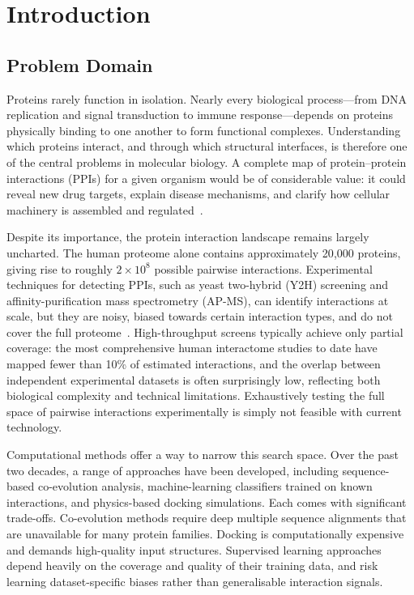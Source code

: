 \chapter{Introduction}
\label{ch:introduction}

\section{Problem Domain}
\label{sec:problem-domain}

Proteins rarely function in isolation.
Nearly every biological process---from DNA replication and signal transduction to immune response---depends on proteins physically binding to one another to form functional complexes.
Understanding which proteins interact, and through which structural interfaces, is therefore one of the central problems in molecular biology.
A complete map of protein--protein interactions (PPIs) for a given organism would be of considerable value: it could reveal new drug targets, explain disease mechanisms, and clarify how cellular machinery is assembled and regulated~\cite{zhang2025ppi}.

Despite its importance, the protein interaction landscape remains largely uncharted.
The human proteome alone contains approximately 20{,}000 proteins, giving rise to roughly $2 \times 10^{8}$ possible pairwise interactions.
Experimental techniques for detecting PPIs, such as yeast two-hybrid (Y2H) screening and affinity-purification mass spectrometry (AP-MS), can identify interactions at scale, but they are noisy, biased towards certain interaction types, and do not cover the full proteome~\cite{zhang2025ppi}.
High-throughput screens typically achieve only partial coverage: the most comprehensive human interactome studies to date have mapped fewer than 10\% of estimated interactions, and the overlap between independent experimental datasets is often surprisingly low, reflecting both biological complexity and technical limitations.
Exhaustively testing the full space of pairwise interactions experimentally is simply not feasible with current technology.

Computational methods offer a way to narrow this search space.
Over the past two decades, a range of approaches have been developed, including sequence-based co-evolution analysis, machine-learning classifiers trained on known interactions, and physics-based docking simulations.
Each comes with significant trade-offs.
Co-evolution methods require deep multiple sequence alignments that are unavailable for many protein families.
Docking is computationally expensive and demands high-quality input structures.
Supervised learning approaches depend heavily on the coverage and quality of their training data, and risk learning dataset-specific biases rather than generalisable interaction signals.

